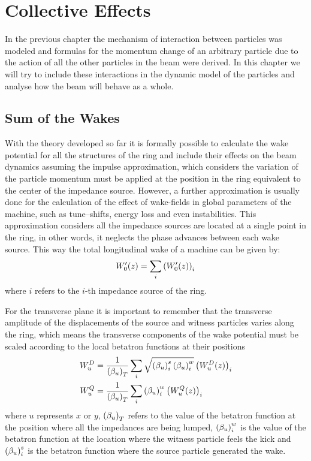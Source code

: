 \chapter{Collective Effects}\label{cap:collective_effects}

    In the previous chapter the mechanism of interaction between particles was modeled and formulas for the momentum change of an arbitrary particle due to the action of all the other particles in the beam were derived. In this chapter we will try to include these interactions in the dynamic model of the particles and analyse how the beam will behave as a whole.

\section{Sum of the Wakes}\label{sec:sum_of_wakes}

    With the theory developed so far it is formally possible to calculate the wake potential for all the structures of the ring and include their effects on the beam dynamics assuming the impulse approximation, which considers the variation of the particle momentum must be applied at the position in the ring equivalent to the center of the impedance source. However, a further approximation is usually done for the calculation of the effect of wake-fields in global parameters of the machine, such as tune--shifts, energy loss and even instabilities. This approximation considers all the impedance sources are located at a single point in the ring, in other words, it neglects the phase advances between each wake source. This way the total longitudinal wake of a machine can be given by:
    \begin{align}\label{eq:scaling_longitudinal}
        W'_0(z) = \sum_i \left(W'_0(z)\right)_i
    \end{align}
    where $i$ refers to the $i$-th impedance source of the ring.

    For the transverse plane it is important to remember that the transverse amplitude of the displacements of the source and witness particles varies along the ring, which means the transverse components of the wake potential must be scaled according to the local betatron functions at their positions
    \begin{align}\label{eq:scaling_transverse_general}\nonumber
        W_u^D &=\frac{1}{\left(\beta_u\right)_T} \sum_i \sqrt{\left(\beta_u\right)_i^s\left(\beta_u\right)_i^w}\left(W_u^D(z)\right)_i \\
        W_u^Q &=\frac{1}{\left(\beta_u\right)_T} \sum_i \left(\beta_u\right)_i^w\left(W_u^Q(z)\right)_i
    \end{align}
    where $u$ represents $x$ or $y$, $\left(\beta_u\right)_T$ refers to the value of the betatron function at the position where all the impedances are being lumped, $\left(\beta_u\right)_i^w$ is the value of the betatron function at the location where the witness particle feels the kick and $\left(\beta_u\right)_i^s$ is the betatron function where the source particle generated the wake.

